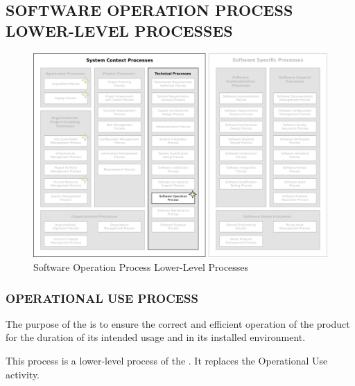 	\subsection{SOFTWARE OPERATION PROCESS LOWER-LEVEL PROCESSES\label{llsubsec:software_operation_processes}}
	\begin{figure}[h]
		\centering
		\includegraphics[width=15cm,keepaspectratio]{figures/life-cycle-process-groups-lower-level-software-operation-processes.pdf}
		\caption{Software Operation Process Lower-Level Processes}
		\label{fig:lower_level_software_operation_processes}
	\end{figure}

		\subsubsection{OPERATIONAL USE PROCESS\label{llproc:operational_use_process}}

			\begin{adjustwidth}{2em}{0pt} 

				The purpose of the  is to ensure the correct and efficient operation of the product for the duration of its intended usage and in its installed environment.

				This process is a lower-level process of the . It replaces the Operational Use activity.

			\end{adjustwidth}

